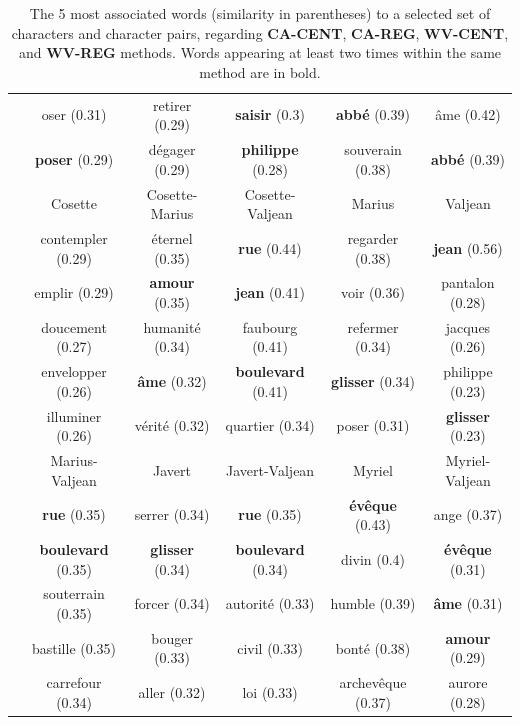 \documentclass[
twocolumn,
]{ceurart}
\begin{document}
\begin{table}[!h]
\begin{tabular}{|c|c|c|c|c|c|}
		& oser (0.31) & retirer (0.29) & \textbf{saisir} (0.3) & \textbf{abbé} (0.39) & âme (0.42) \\
		& \textbf{poser} (0.29) & dégager (0.29) & \textbf{philippe} (0.28) & souverain (0.38) & \textbf{abbé} (0.39) \\
		\hline
		\hline
		\parbox[t]{2mm}{} & Cosette & Cosette-Marius & Cosette-Valjean & Marius & Valjean \\ 
		& contempler (0.29) & éternel (0.35) & \textbf{rue} (0.44) & regarder (0.38) & \textbf{jean} (0.56) \\
		& emplir (0.29) & \textbf{amour} (0.35) & \textbf{jean} (0.41) & voir (0.36) & pantalon (0.28) \\
		& doucement (0.27) & humanité (0.34) & faubourg (0.41) & refermer (0.34) & jacques (0.26) \\
		& envelopper (0.26) & \textbf{âme} (0.32) & \textbf{boulevard} (0.41) & \textbf{glisser} (0.34) & philippe (0.23) \\
		& illuminer (0.26) & vérité (0.32) & quartier (0.34) & poser (0.31) & \textbf{glisser} (0.23) \\ 
		& Marius-Valjean & Javert & Javert-Valjean & Myriel & Myriel-Valjean \\
		& \textbf{rue} (0.35) & serrer (0.34) & \textbf{rue} (0.35) & \textbf{évêque} (0.43) & ange (0.37) \\
		& \textbf{boulevard} (0.35) & \textbf{glisser} (0.34) & \textbf{boulevard} (0.34) & divin (0.4) & \textbf{évêque} (0.31) \\
		& souterrain (0.35) & forcer (0.34) & autorité (0.33) & humble (0.39) & \textbf{âme} (0.31) \\
		& bastille (0.35) & bouger (0.33) & civil (0.33) & bonté (0.38) & \textbf{amour} (0.29) \\
		& carrefour (0.34) & aller (0.32) & loi (0.33) & archevêque (0.37) & aurore (0.28) \\
		\hline
	\end{tabular}
	
	\label{word_vs_obj}
	\caption{The 5 most associated words (similarity in parentheses) to a selected set of characters and character pairs, regarding \textbf{CA-CENT}, \textbf{CA-REG}, \textbf{WV-CENT}, and \textbf{WV-REG} methods. Words appearing at least two times within the same method are in bold.}
\end{table}
	
\end{document}
